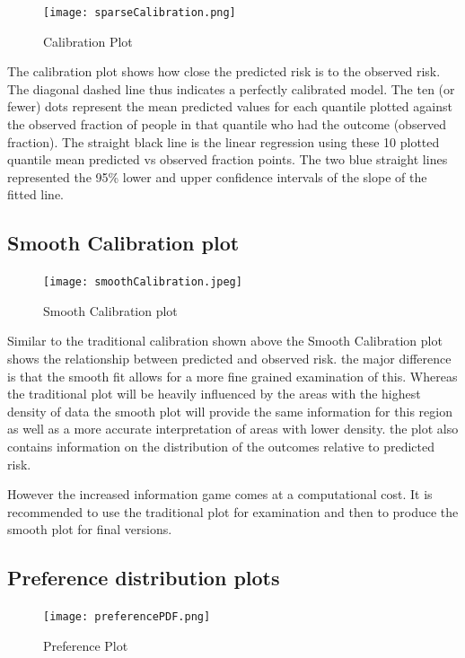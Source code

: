 \documentclass[]{article}
\begin{document}
\begin{figure}
\centering
\texttt{[image: sparseCalibration.png]}
\caption{Calibration Plot}
\end{figure}

The calibration plot shows how close the predicted risk is to the
observed risk. The diagonal dashed line thus indicates a perfectly
calibrated model. The ten (or fewer) dots represent the mean predicted
values for each quantile plotted against the observed fraction of people
in that quantile who had the outcome (observed fraction). The straight
black line is the linear regression using these 10 plotted quantile mean
predicted vs observed fraction points. The two blue straight lines
represented the 95\% lower and upper confidence intervals of the slope
of the fitted line.

\newpage

\subsection{Smooth Calibration plot}\label{smooth-calibration-plot}

\begin{figure}
\centering
\texttt{[image: smoothCalibration.jpeg]}
\caption{Smooth Calibration plot}
\end{figure}

Similar to the traditional calibration shown above the Smooth
Calibration plot shows the relationship between predicted and observed
risk. the major difference is that the smooth fit allows for a more fine
grained examination of this. Whereas the traditional plot will be
heavily influenced by the areas with the highest density of data the
smooth plot will provide the same information for this region as well as
a more accurate interpretation of areas with lower density. the plot
also contains information on the distribution of the outcomes relative
to predicted risk.

However the increased information game comes at a computational cost. It
is recommended to use the traditional plot for examination and then to
produce the smooth plot for final versions.

\newpage

\subsection{Preference distribution
plots}\label{preference-distribution-plots}

\begin{figure}
\centering
\texttt{[image: preferencePDF.png]}
\caption{Preference Plot}
\end{figure}
\end{document}

